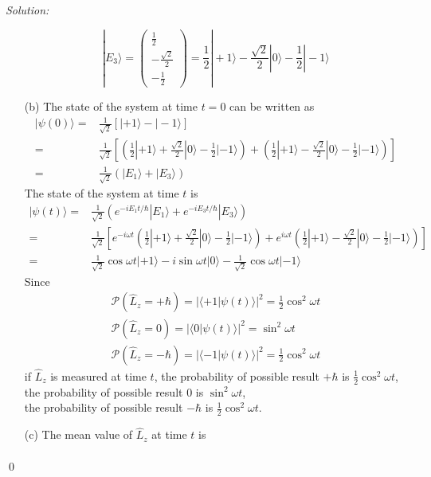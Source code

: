 \documentclass[12pt,a4paper]{article}
\newenvironment{sol}
    {\emph{Solution:}
    }
    {
    \qed
    }
\begin{document}
\begin{sol}
\begin{itemize}
\begin{equation}
|E_3\rangle=\left(\begin{array}{c}
\frac{1}{2}\\
-\frac{\sqrt{2}}{2}\\
-\frac{1}{2}
\end{array}\right)=\frac{1}{2}|+1\rangle-\frac{\sqrt{2}}{2}|0\rangle-\frac{1}{2}|-1\rangle
\end{equation}
\item[(b)] The state of the system at time $t=0$ can be written as
\begin{align}
\nonumber|\psi(0)\rangle=&\frac{1}{\sqrt{2}}[|+1\rangle-|-1\rangle]\\
\nonumber=&\frac{1}{\sqrt{2}}[(\frac{1}{2}|+1\rangle+\frac{\sqrt{2}}{2}|0\rangle-\frac{1}{2}|-1\rangle)+(\frac{1}{2}|+1\rangle-\frac{\sqrt{2}}{2}|0\rangle-\frac{1}{2}|-1\rangle)]\\
=&\frac{1}{\sqrt{2}}(|E_1\rangle+|E_3\rangle)
\end{align}
The state of the system at time $t$ is
\begin{align}
\nonumber|\psi(t)\rangle=&\frac{1}{\sqrt{2}}(e^{-iE_1t/\hbar}|E_1\rangle+e^{-iE_3t/\hbar}|E_3\rangle)\\
\nonumber=&\frac{1}{\sqrt{2}}[e^{-i\omega t}(\frac{1}{2}|+1\rangle+\frac{\sqrt{2}}{2}|0\rangle-\frac{1}{2}|-1\rangle)+e^{i\omega t}(\frac{1}{2}|+1\rangle-\frac{\sqrt{2}}{2}|0\rangle-\frac{1}{2}|-1\rangle)]\\
=&\frac{1}{\sqrt{2}}\cos\omega t|+1\rangle-i\sin\omega t|0\rangle-\frac{1}{\sqrt{2}}\cos\omega t|-1\rangle
\end{align}
Since
\begin{gather}
\mathcal{P}(\hat{L}_z=+\hbar)=|\langle+1|\psi(t)\rangle|^2=\frac{1}{2}\cos^2\omega t\\
\mathcal{P}(\hat{L}_z=0)=|\langle0|\psi(t)\rangle|^2=\sin^2\omega t\\
\mathcal{P}(\hat{L}_z=-\hbar)=|\langle-1|\psi(t)\rangle|^2=\frac{1}{2}\cos^2\omega t
\end{gather}
if $\hat{L}_z$ is measured at time $t$, the probability of possible result $+\hbar$ is $\frac{1}{2}\cos^2\omega t$,\\
the probability of possible result $0$ is $\sin^2\omega t$,\\
the probability of possible result $-\hbar$ is $\frac{1}{2}\cos^2\omega t$.
\item[(c)] The mean value of $\hat{L}_z$ at time $t$ is
\begin{align}

\end{align}
\end{itemize}
\end{sol}
\end{document}

